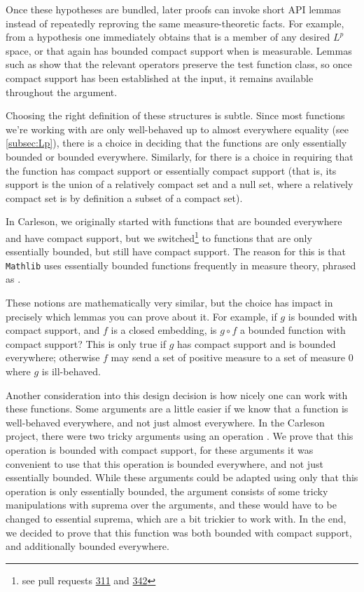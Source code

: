 \documentclass[12pt]{amsart}
\newcommand{\mathlib}{\texttt{Mathlib}\xspace}
\theoremstyle{definition}
\theoremstyle{plain}
\begin{document}
Once these hypotheses are bundled, later proofs can invoke short API lemmas instead of repeatedly
reproving the same measure-theoretic facts. For example, from a hypothesis
 one immediately obtains that  is a member of
any desired $L^p$ space, %
or that  again has bounded compact support when  is measurable.
Lemmas such as  show that the relevant
operators preserve the test function class, so once compact support has been established at the input, it remains available throughout the argument.

Choosing the right definition of these structures is subtle.
Since most functions we're working with are only well-behaved up to almost everywhere equality (see \ref{subsec:Lp}),
there is a choice in deciding that the functions are only essentially bounded or bounded everywhere.
Similarly, for  there is a choice in requiring that the function has compact support or essentially compact support
(that is, its support is the union of a relatively compact set and a null set,
where a relatively compact set is by definition a subset of a compact set).

In Carleson, we originally started with functions that are bounded everywhere and have compact support,
but we switched\footnote{see pull requests \href{https://github.com/fpvandoorn/carleson/pull/311}{311} and \href{https://github.com/fpvandoorn/carleson/pull/342}{342}} to functions that are only essentially bounded,
but still have compact support.
The reason for this is that \mathlib uses essentially bounded functions frequently in measure theory,
phrased as .

These notions are mathematically very similar,
but the choice has impact in precisely which lemmas you can prove about it.
For example, if $g$ is bounded with compact support, and $f$ is a closed embedding,
is $g\circ f$ a bounded function with compact support?
This is only true if $g$ has compact support and is bounded everywhere;
otherwise $f$ may send a set of positive measure to a set of measure 0 where $g$ is ill-behaved.

Another consideration into this design decision is how nicely one can work with these functions.
Some arguments are a little easier if we know that a function is well-behaved everywhere,
and not just almost everywhere.
In the Carleson project, there were two tricky arguments using an operation .
We prove that this operation is bounded with compact support,
for these arguments it was convenient to use that this operation is bounded everywhere,
and not just essentially bounded.
While these arguments could be adapted using only that this operation is only essentially bounded,
the argument consists of some tricky manipulations with suprema over the arguments,
and these would have to be changed to essential suprema, which are a bit trickier to work with.
In the end, we decided to prove that this function was both bounded with compact support,
and additionally bounded everywhere.
\end{document}
